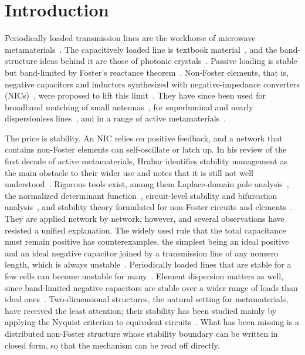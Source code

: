 \documentclass[aps,prapplied,twocolumn,superscriptaddress,floatfix,longbibliography]{revtex4-2}
\begin{document}
\section{Introduction}

Periodically loaded transmission lines are the workhorse of microwave metamaterials~\cite{Eleftheriades_2002:TMTT,Caloz_2006:book}. The capacitively loaded line is textbook material~\cite{Pozar_2012:book}, and the band-structure ideas behind it are those of photonic crystals~\cite{Joannopoulos_2008:book}. Passive loading is stable but band-limited by Foster's reactance theorem~\cite{Foster_1924:BSTJ}. Non-Foster elements, that is, negative capacitors and inductors synthesized with negative-impedance converters (NICs)~\cite{Linvill_1953:PIRE}, were proposed to lift this limit~\cite{Tretyakov_2001:MOTL}. They have since been used for broadband matching of small antennas~\cite{SussmanFort_2009:TAP}, for superluminal and nearly dispersionless lines~\cite{Sievenpiper_2011:AWPL,Hrabar_2011:APL,Long_2014:TMTT,Long_2018:TMTT}, and in a range of active metamaterials~\cite{Hrabar_2018:EPJAM}.

The price is stability. An NIC relies on positive feedback, and a network that contains non-Foster elements can self-oscillate or latch up. In his review of the first decade of active metamaterials, Hrabar identifies stability management as the main obstacle to their wider use and notes that it is still not well understood~\cite{Hrabar_2018:EPJAM}. Rigorous tools exist, among them Laplace-domain pole analysis~\cite{Hrabar_2012:Automatika,Loncar_2017:TAP}, the normalized determinant function~\cite{Tang_2017:TMTT}, circuit-level stability and bifurcation analysis~\cite{Suarez_2018:TMTT}, and stability theory formulated for non-Foster circuits and elements~\cite{Stearns_2011:APS,Stearns_2013:IMS,Ugarte_2012:TAP}. They are applied network by network, however, and several observations have resisted a unified explanation. The widely used rule that the total capacitance must remain positive has counterexamples, the simplest being an ideal positive and an ideal negative capacitor joined by a transmission line of any nonzero length, which is always unstable~\cite{Loncar_2017:TAP}. Periodically loaded lines that are stable for a few cells can become unstable for many~\cite{Rengarajan_2013:AWPL}. Element dispersion matters as well, since band-limited negative capacitors are stable over a wider range of loads than ideal ones~\cite{Zanic_2024:AIPA}. Two-dimensional structures, the natural setting for metamaterials, have received the least attention; their stability has been studied mainly by applying the Nyquist criterion to equivalent circuits~\cite{Rajab_2010:JAP}. What has been missing is a distributed non-Foster structure whose stability boundary can be written in closed form, so that the mechanism can be read off directly.
\end{document}
